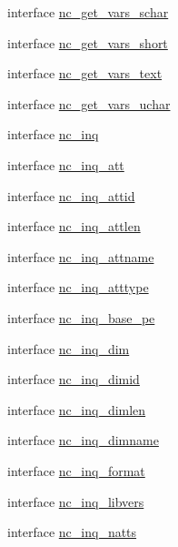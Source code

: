 \begin{DoxyCompactItemize}
\item 
interface \hyperlink{interfacenetcdf__nc__interfaces_1_1nc__get__vars__schar}{nc\+\_\+get\+\_\+vars\+\_\+schar}
\item 
interface \hyperlink{interfacenetcdf__nc__interfaces_1_1nc__get__vars__short}{nc\+\_\+get\+\_\+vars\+\_\+short}
\item 
interface \hyperlink{interfacenetcdf__nc__interfaces_1_1nc__get__vars__text}{nc\+\_\+get\+\_\+vars\+\_\+text}
\item 
interface \hyperlink{interfacenetcdf__nc__interfaces_1_1nc__get__vars__uchar}{nc\+\_\+get\+\_\+vars\+\_\+uchar}
\item 
interface \hyperlink{interfacenetcdf__nc__interfaces_1_1nc__inq}{nc\+\_\+inq}
\item 
interface \hyperlink{interfacenetcdf__nc__interfaces_1_1nc__inq__att}{nc\+\_\+inq\+\_\+att}
\item 
interface \hyperlink{interfacenetcdf__nc__interfaces_1_1nc__inq__attid}{nc\+\_\+inq\+\_\+attid}
\item 
interface \hyperlink{interfacenetcdf__nc__interfaces_1_1nc__inq__attlen}{nc\+\_\+inq\+\_\+attlen}
\item 
interface \hyperlink{interfacenetcdf__nc__interfaces_1_1nc__inq__attname}{nc\+\_\+inq\+\_\+attname}
\item 
interface \hyperlink{interfacenetcdf__nc__interfaces_1_1nc__inq__atttype}{nc\+\_\+inq\+\_\+atttype}
\item 
interface \hyperlink{interfacenetcdf__nc__interfaces_1_1nc__inq__base__pe}{nc\+\_\+inq\+\_\+base\+\_\+pe}
\item 
interface \hyperlink{interfacenetcdf__nc__interfaces_1_1nc__inq__dim}{nc\+\_\+inq\+\_\+dim}
\item 
interface \hyperlink{interfacenetcdf__nc__interfaces_1_1nc__inq__dimid}{nc\+\_\+inq\+\_\+dimid}
\item 
interface \hyperlink{interfacenetcdf__nc__interfaces_1_1nc__inq__dimlen}{nc\+\_\+inq\+\_\+dimlen}
\item 
interface \hyperlink{interfacenetcdf__nc__interfaces_1_1nc__inq__dimname}{nc\+\_\+inq\+\_\+dimname}
\item 
interface \hyperlink{interfacenetcdf__nc__interfaces_1_1nc__inq__format}{nc\+\_\+inq\+\_\+format}
\item 
interface \hyperlink{interfacenetcdf__nc__interfaces_1_1nc__inq__libvers}{nc\+\_\+inq\+\_\+libvers}
\item 
interface \hyperlink{interfacenetcdf__nc__interfaces_1_1nc__inq__natts}{nc\+\_\+inq\+\_\+natts}

\end{DoxyCompactItemize}
